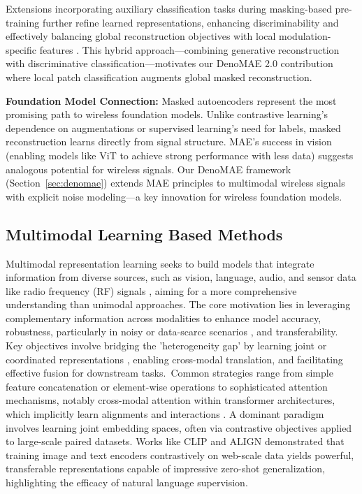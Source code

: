 Extensions incorporating auxiliary classification tasks during masking-based pre-training further refine learned representations, enhancing discriminability and effectively balancing global reconstruction objectives with local modulation-specific features \cite{he2022mae}. This hybrid approach—combining generative reconstruction with discriminative classification—motivates our DenoMAE 2.0 contribution where local patch classification augments global masked reconstruction.

\textbf{Foundation Model Connection:} Masked autoencoders represent the most promising path to wireless foundation models. Unlike contrastive learning's dependence on augmentations or supervised learning's need for labels, masked reconstruction learns directly from signal structure. MAE's success in vision (enabling models like ViT to achieve strong performance with less data) suggests analogous potential for wireless signals. Our DenoMAE framework (Section~\ref{sec:denomae}) extends MAE principles to multimodal wireless signals with explicit noise modeling—a key innovation for wireless foundation models.

\subsection{Multimodal Learning Based Methods}\label{sec:multi}

Multimodal representation learning seeks to build models that integrate information from diverse sources, such as vision, language, audio, and sensor data like radio frequency (RF) signals \cite{yuan2025survey}, aiming for a more comprehensive understanding than unimodal approaches. The core motivation lies in leveraging complementary information across modalities  to enhance model accuracy, robustness, particularly in noisy or data-scarce scenarios \cite{akkus2023multimodal}, and transferability. Key objectives involve bridging the 'heterogeneity gap'  by learning joint or coordinated representations \cite{li2024multimodal}, enabling cross-modal translation, and facilitating effective fusion for downstream tasks. Common strategies range from simple feature concatenation or element-wise operations to sophisticated attention mechanisms, notably cross-modal attention within transformer architectures, which implicitly learn alignments and interactions \cite{liang2024crossformer}. A dominant paradigm involves learning joint embedding spaces, often via contrastive objectives applied to large-scale paired datasets. Works like CLIP \cite{radford2021learning} and ALIGN \cite{jia2021scaling} demonstrated that training image and text encoders contrastively on web-scale data yields powerful, transferable representations capable of impressive zero-shot generalization, highlighting the efficacy of natural language supervision.

